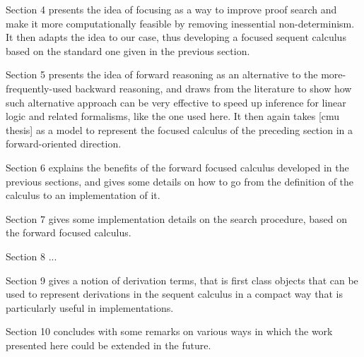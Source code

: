 Section 4 presents the idea of focusing as a way to improve proof search and
make it more computationally feasible by removing inessential
non-determinism. It then adapts the idea to our case, thus developing a focused
sequent calculus based on the standard one given in the previous section.

Section 5 presents the idea of forward reasoning as an alternative to the
more-frequently-used backward reasoning, and draws from the literature to show
how such alternative approach can be very effective to speed up inference for
linear logic and related formalisms, like the one used here.  It then again
takes [cmu thesis] as a model to represent the focused calculus of the preceding
section in a forward-oriented direction.

Section 6 explains the benefits of the forward focused calculus developed in the
previous sections, and gives some details on how to go from the definition of
the calculus to an implementation of it.

Section 7 gives some implementation details on the search procedure, based on
the forward focused calculus.

Section 8 ...

Section 9 gives a notion of derivation terms, that is first class objects that
can be used to represent derivations in the sequent calculus in a compact way
that is particularly useful in implementations.

Section 10 concludes with some remarks on various ways in which the work
presented here could be extended in the future.










